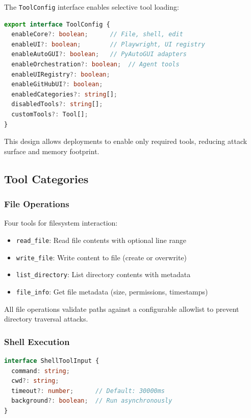 \documentclass[11pt,twocolumn]{article}
\begin{document}
The \texttt{ToolConfig} interface enables selective tool loading:

\begin{lstlisting}[language=TypeScript]
export interface ToolConfig {
  enableCore?: boolean;      // File, shell, edit
  enableUI?: boolean;        // Playwright, UI registry
  enableAutoGUI?: boolean;   // PyAutoGUI adapters
  enableOrchestration?: boolean;  // Agent tools
  enableUIRegistry?: boolean;
  enableGitHubUI?: boolean;
  enabledCategories?: string[];
  disabledTools?: string[];
  customTools?: Tool[];
}
\end{lstlisting}

This design allows deployments to enable only required tools, reducing attack surface and memory footprint.

\subsection{Tool Categories}

\subsubsection{File Operations}

Four tools for filesystem interaction:
\begin{itemize}
    \item \texttt{read\_file}: Read file contents with optional line range
    \item \texttt{write\_file}: Write content to file (create or overwrite)
    \item \texttt{list\_directory}: List directory contents with metadata
    \item \texttt{file\_info}: Get file metadata (size, permissions, timestamps)
\end{itemize}

All file operations validate paths against a configurable allowlist to prevent directory traversal attacks.

\subsubsection{Shell Execution}

\begin{lstlisting}[language=TypeScript]
interface ShellToolInput {
  command: string;
  cwd?: string;
  timeout?: number;      // Default: 30000ms
  background?: boolean;  // Run asynchronously
}
\end{lstlisting}
\end{document}
